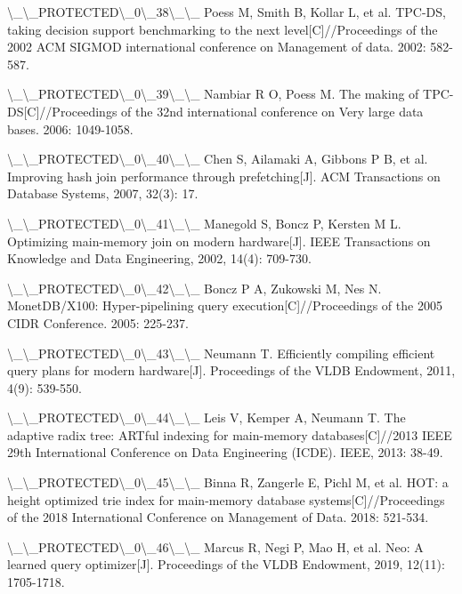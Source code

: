 \textbackslash{}_\textbackslash{}_PROTECTED\textbackslash{}_0\textbackslash{}_38\textbackslash{}_\textbackslash{}_ Poess M, Smith B, Kollar L, et al. TPC-DS, taking decision support benchmarking to the next level[C]//Proceedings of the 2002 ACM SIGMOD international conference on Management of data. 2002: 582-587.

\textbackslash{}_\textbackslash{}_PROTECTED\textbackslash{}_0\textbackslash{}_39\textbackslash{}_\textbackslash{}_ Nambiar R O, Poess M. The making of TPC-DS[C]//Proceedings of the 32nd international conference on Very large data bases. 2006: 1049-1058.

\textbackslash{}_\textbackslash{}_PROTECTED\textbackslash{}_0\textbackslash{}_40\textbackslash{}_\textbackslash{}_ Chen S, Ailamaki A, Gibbons P B, et al. Improving hash join performance through prefetching[J]. ACM Transactions on Database Systems, 2007, 32(3): 17.

\textbackslash{}_\textbackslash{}_PROTECTED\textbackslash{}_0\textbackslash{}_41\textbackslash{}_\textbackslash{}_ Manegold S, Boncz P, Kersten M L. Optimizing main-memory join on modern hardware[J]. IEEE Transactions on Knowledge and Data Engineering, 2002, 14(4): 709-730.

\textbackslash{}_\textbackslash{}_PROTECTED\textbackslash{}_0\textbackslash{}_42\textbackslash{}_\textbackslash{}_ Boncz P A, Zukowski M, Nes N. MonetDB/X100: Hyper-pipelining query execution[C]//Proceedings of the 2005 CIDR Conference. 2005: 225-237.

\textbackslash{}_\textbackslash{}_PROTECTED\textbackslash{}_0\textbackslash{}_43\textbackslash{}_\textbackslash{}_ Neumann T. Efficiently compiling efficient query plans for modern hardware[J]. Proceedings of the VLDB Endowment, 2011, 4(9): 539-550.

\textbackslash{}_\textbackslash{}_PROTECTED\textbackslash{}_0\textbackslash{}_44\textbackslash{}_\textbackslash{}_ Leis V, Kemper A, Neumann T. The adaptive radix tree: ARTful indexing for main-memory databases[C]//2013 IEEE 29th International Conference on Data Engineering (ICDE). IEEE, 2013: 38-49.

\textbackslash{}_\textbackslash{}_PROTECTED\textbackslash{}_0\textbackslash{}_45\textbackslash{}_\textbackslash{}_ Binna R, Zangerle E, Pichl M, et al. HOT: a height optimized trie index for main-memory database systems[C]//Proceedings of the 2018 International Conference on Management of Data. 2018: 521-534.

\textbackslash{}_\textbackslash{}_PROTECTED\textbackslash{}_0\textbackslash{}_46\textbackslash{}_\textbackslash{}_ Marcus R, Negi P, Mao H, et al. Neo: A learned query optimizer[J]. Proceedings of the VLDB Endowment, 2019, 12(11): 1705-1718.

